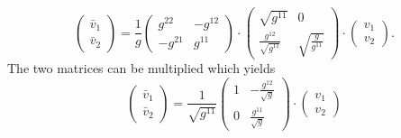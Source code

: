 \begin{displaymath}
   \left(
    \begin{array}{c}
      \bar v_1\\ \bar{v}_2
    \end{array}
  \right)
  = \frac{1}{g}\left(
    \begin{array}{cc}
      g^{22} & -g^{12}\\
      -g^{21} & g^{11}
    \end{array}
  \right)\cdot\left(
    \begin{array}{cc}
      \sqrt{g^{11}} &
      0\\
      \frac{g^{12}}{\sqrt{g^{11}}} &
      \sqrt{\frac{g}{g^{11}}}
    \end{array}\right)\cdot\left(
    \begin{array}{c}
      v_1 \\
      v_2
    \end{array}
  \right).
\end{displaymath}
The two matrices can be multiplied which yields
\begin{displaymath}
   \left(
    \begin{array}{c}
      \bar v_1\\ \bar{v}_2
    \end{array}
  \right)
  = \frac{1}{\sqrt{g^{11}}}\left(
    \begin{array}{cc}
      1 & -\frac{g^{12}}{\sqrt{g}}\\
      0 & \frac{g^{11}}{\sqrt{g}}
    \end{array}
  \right)\cdot\left(
    \begin{array}{c}
      v_1 \\
      v_2
    \end{array}
  \right)
\end{displaymath}


